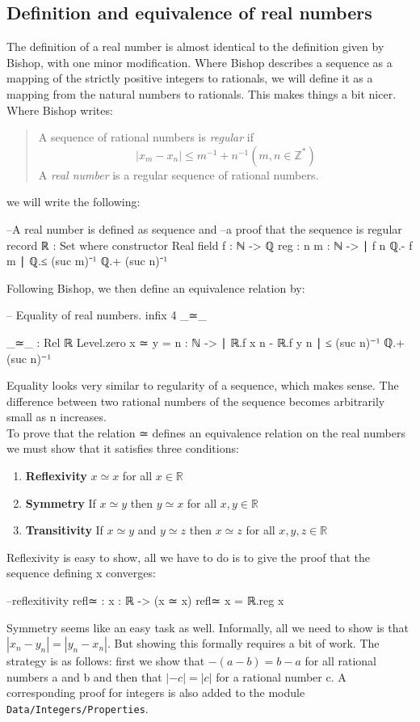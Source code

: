 \documentclass[11pt,a4paper]{article}
\begin{document}
\subsection{Definition and equivalence of real numbers}
The definition of a real number is almost identical to the definition given by Bishop, with one minor modification. Where Bishop describes a sequence as a mapping of the strictly positive integers to rationals, we will define it as a mapping from the natural numbers to rationals. This makes things a bit nicer. Where Bishop writes:
\blockquote{
A sequence of rational numbers is \textit{regular} if 
$$| x_m - x_n | \leq m^{-1} + n^{-1} (m, n \in \mathbb{Z}^*)$$
A \textit{real number} is a regular sequence of rational numbers.
}
we will write the following:
\begin{code}
--A real number is defined as sequence and 
--a proof that the sequence is regular
record ℝ : Set where
  constructor Real
  field
    f : ℕ -> ℚ
    reg : {n m : ℕ} -> ∣ f n ℚ.- f m ∣ ℚ.≤ (suc m)⁻¹ ℚ.+ (suc n)⁻¹
\end{code}
Following Bishop, we then define an equivalence relation by:
\begin{code}
-- Equality of real numbers.
infix 4 _≃_

_≃_ : Rel ℝ Level.zero
x ≃ y =  {n : ℕ} -> ∣ ℝ.f x n - ℝ.f y n ∣ ≤ (suc n)⁻¹ ℚ.+ (suc n)⁻¹
\end{code}
Equality looks very similar to regularity of a sequence, which makes sense. The difference between two rational numbers of the sequence becomes arbitrarily small as n increases.\\
To prove that the relation ≃ defines an equivalence relation on the real numbers we must show that it satisfies three conditions:
\begin{enumerate}
\item \textbf{Reflexivity} $x ≃ x$ for all $x \in \mathbb{R}$
\item \textbf{Symmetry} If $x ≃ y$ then $y ≃ x$ for all $x, y \in \mathbb{R}$
\item \textbf{Transitivity} If $x ≃ y$ and $y ≃ z$ then $x ≃ z$ for all $x, y, z \in \mathbb{R}$
\end{enumerate}
Reflexivity is easy to show, all we have to do is to give the proof that the sequence defining x converges:
\begin{code}
--reflexitivity
refl≃ : {x : ℝ} -> (x ≃ x)
refl≃ {x} = ℝ.reg x
\end{code}
Symmetry seems like an easy task as well. Informally, all we need to show is that $| x_n - y_n | = | y_n - x_n|$. But showing this formally requires a bit of work. The strategy is as follows: first we show that $- (a - b) = b - a$ for all rational numbers a and b and then that $| - c | = | c |$ for a rational number c. A corresponding proof for integers is also added to the module \texttt{Data/Integers/Properties}.\\
\end{document}
